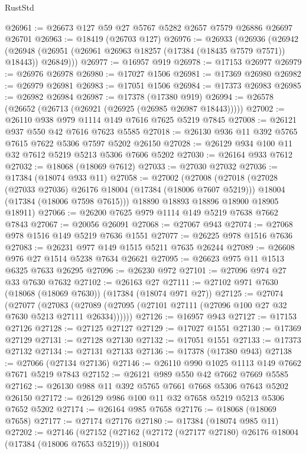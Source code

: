 \begin{lexlean}{RustStd}
\begin{coremodule}
@26961 := @26673 @127 @59 @27 @5767 @5282 @2657 @7579 @26886 @26697 @26701
@26963 := @18419 (@26703 @127)
@26976 := @26933
    (@26936
      (@26942 (@26948 (@26951 (@26961 @26963 @18257 (@17384 (@18435 @7579 @7571)) @18443)) @26849)))
@26977 := @16957 @919
@26978 := @17153 @26977
@26979 := @26976 @26978
@26980 := @17027 @1506
@26981 := @17369 @26980
@26982 := @26979 @26981
@26983 := @17051 @1506
@26984 := @17373 @26983
@26985 := @26982 @26984
@26987 := @17378 (@17380 @919)
@26994 := @26578 (@26652 (@26713 (@26921 (@26925 (@26985 @26987 @18443)))))
@27002 := @26110 @938 @979 @1114 @149 @7616 @7625 @5219 @7845
@27008 := @26121 @937 @550 @42 @7616 @7623 @5585
@27018 := @26130 @936 @11 @392 @5765 @7615 @7622 @5306 @7597 @5202 @26150
@27028 := @26129 @934 @100 @11 @32 @7612 @5219 @5213 @5306 @7606 @5202
@27030 := @26164 @933 @7612
@27032 := @18068 (@18069 @7612)
@27033 := @27030 @27032
@27036 := @17384 (@18074 @933 @11)
@27058 := @27002
    (@27008
      (@27018
        (@27028 (@27033 @27036) @26176 @18004 (@17384 (@18006 @7607 @5219)))
        @18004
        (@17384 (@18006 @7598 @7615)))
      @18890
      @18893
      @18896
      @18900
      @18905
      @18911)
@27066 := @26200 @7625 @979 @1114 @149 @5219 @7638 @7662 @7843
@27067 := @20056 @26091
@27068 := @27067 @943
@27074 := @27068 @978 @1516 @149 @5219 @7636 @1551
@27077 := @26225 @978 @1516 @7636
@27083 := @26231 @977 @149 @1515 @5211 @7635 @26244
@27089 := @26608 @976 @27 @1514 @5238 @7634 @26621
@27095 := @26623 @975 @11 @1513 @6325 @7633 @26295
@27096 := @26230 @972
@27101 := @27096 @974 @27 @33 @7630 @7632
@27102 := @26163 @27
@27111 := @27102 @971 @7630 (@18068 (@18069 @7630)) (@17384 (@18074 @971 @27))
@27125 := @27074
    (@27077
      (@27083 (@27089 (@27095 (@27101 @27111 (@27096 @100 @27 @32 @7630 @5213 @27111 @26334))))))
@27126 := @16957 @943
@27127 := @17153 @27126
@27128 := @27125 @27127
@27129 := @17027 @1551
@27130 := @17369 @27129
@27131 := @27128 @27130
@27132 := @17051 @1551
@27133 := @17373 @27132
@27134 := @27131 @27133
@27136 := @17378 (@17380 @943)
@27138 := @27066 (@27134 @27136)
@27146 := @26110 @990 @1025 @1113 @149 @7662 @7671 @5219 @7843
@27152 := @26121 @989 @550 @42 @7662 @7669 @5585
@27162 := @26130 @988 @11 @392 @5765 @7661 @7668 @5306 @7643 @5202 @26150
@27172 := @26129 @986 @100 @11 @32 @7658 @5219 @5213 @5306 @7652 @5202
@27174 := @26164 @985 @7658
@27176 := @18068 (@18069 @7658)
@27177 := @27174 @27176
@27180 := @17384 (@18074 @985 @11)
@27202 := @27146
    (@27152
      (@27162
        (@27172 (@27177 @27180) @26176 @18004 (@17384 (@18006 @7653 @5219)))
        @18004

\end{coremodule}
\end{lexlean}
